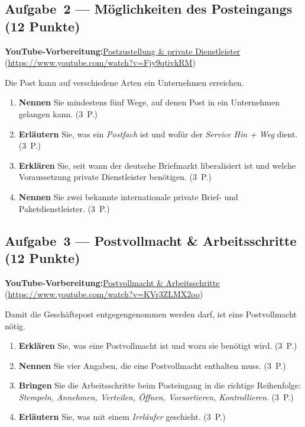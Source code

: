 \documentclass[11pt, a4paper]{article}
\begin{document}
\subsection*{Aufgabe~2 --- Möglichkeiten des Posteingangs (12 Punkte)}

\noindent\textbf{\color{bfwAccent}YouTube-Vorbereitung:}\enspace \href{https://www.youtube.com/watch?v=Fjy9qtivkRM}{Postzustellung \& private Dienstleister} (\url{https://www.youtube.com/watch?v=Fjy9qtivkRM})

\medskip
Die Post kann auf verschiedene Arten ein Unternehmen erreichen.

\begin{enumerate}[label=(\alph*)]
  \item \textbf{Nennen} Sie mindestens fünf Wege, auf denen Post in ein Unternehmen gelangen kann. \hfill (3~P.)
  \item \textbf{Erläutern} Sie, was ein \emph{Postfach} ist und wofür der \emph{Service Hin + Weg} dient. \hfill (3~P.)
  \item \textbf{Erklären} Sie, seit wann der deutsche Briefmarkt liberalisiert ist und welche Voraussetzung private Dienstleister benötigen. \hfill (3~P.)
  \item \textbf{Nennen} Sie zwei bekannte internationale private Brief- und Paketdienstleister. \hfill (3~P.)
\end{enumerate}

\subsection*{Aufgabe~3 --- Postvollmacht \& Arbeitsschritte (12 Punkte)}

\noindent\textbf{\color{bfwAccent}YouTube-Vorbereitung:}\enspace \href{https://www.youtube.com/watch?v=KVr3ZLMX2oo}{Postvollmacht \& Arbeitsschritte} (\url{https://www.youtube.com/watch?v=KVr3ZLMX2oo})

\medskip
Damit die Geschäftspost entgegengenommen werden darf, ist eine Postvollmacht nötig.

\begin{enumerate}[label=(\alph*)]
  \item \textbf{Erklären} Sie, was eine Postvollmacht ist und wozu sie benötigt wird. \hfill (3~P.)
  \item \textbf{Nennen} Sie vier Angaben, die eine Postvollmacht enthalten muss. \hfill (3~P.)
  \item \textbf{Bringen} Sie die Arbeitsschritte beim Posteingang in die richtige Reihenfolge: \emph{Stempeln, Annehmen, Verteilen, Öffnen, Vorsortieren, Kontrollieren}. \hfill (3~P.)
  \item \textbf{Erläutern} Sie, was mit einem \emph{Irrläufer} geschieht. \hfill (3~P.)
\end{enumerate}
\end{document}
